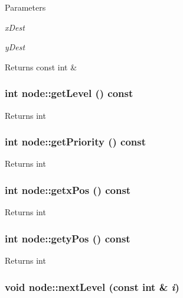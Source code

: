 \begin{DoxyParams}{Parameters}
\item[{\em xDest}]\item[{\em yDest}]\end{DoxyParams}
\begin{DoxyReturn}{Returns}
const int \& 
\end{DoxyReturn}
\hypertarget{classnode_a78c66d7badca074b6b34ec7eca4ab106}{
\subsubsection[{getLevel}]{\setlength{\rightskip}{0pt plus 5cm}int node::getLevel () const}}
\label{classnode_a78c66d7badca074b6b34ec7eca4ab106}
\begin{DoxyReturn}{Returns}
int 
\end{DoxyReturn}
\hypertarget{classnode_afebf5ef7f94fa7554890f03e97686de7}{
\subsubsection[{getPriority}]{\setlength{\rightskip}{0pt plus 5cm}int node::getPriority () const}}
\label{classnode_afebf5ef7f94fa7554890f03e97686de7}
\begin{DoxyReturn}{Returns}
int 
\end{DoxyReturn}
\hypertarget{classnode_a419596f9858640ee6d04b69b616b7cd2}{
\subsubsection[{getxPos}]{\setlength{\rightskip}{0pt plus 5cm}int node::getxPos () const}}
\label{classnode_a419596f9858640ee6d04b69b616b7cd2}
\begin{DoxyReturn}{Returns}
int 
\end{DoxyReturn}
\hypertarget{classnode_a3b5d135d5e5eac9211a9478ea9803ae7}{
\subsubsection[{getyPos}]{\setlength{\rightskip}{0pt plus 5cm}int node::getyPos () const}}
\label{classnode_a3b5d135d5e5eac9211a9478ea9803ae7}
\begin{DoxyReturn}{Returns}
int 
\end{DoxyReturn}
\hypertarget{classnode_a04a186013c42fb942b6da90d2e98d4ed}{
\subsubsection[{nextLevel}]{\setlength{\rightskip}{0pt plus 5cm}void node::nextLevel (const int \& {\em i})}}
\label{classnode_a04a186013c42fb942b6da90d2e98d4ed}

